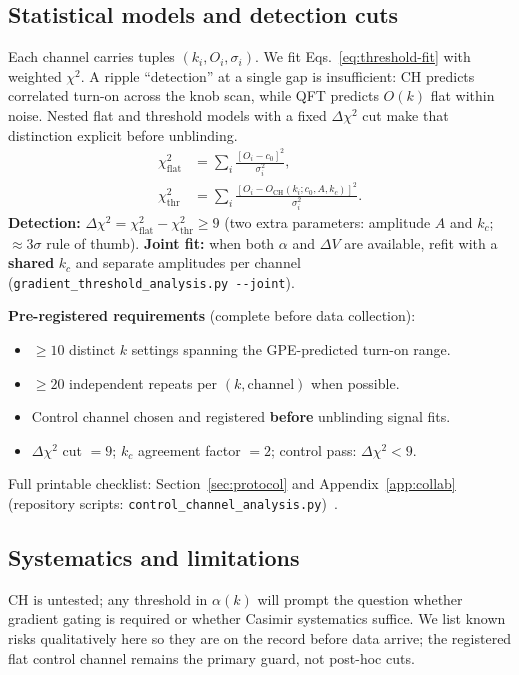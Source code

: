 \documentclass[11pt,a4paper]{article}
\newcommand{\py}[1]{\nolinkurl{#1}}
\begin{document}
\subsection{Statistical models and detection cuts}

Each channel carries tuples $(k_i, O_i, \sigma_i)$.
We fit Eqs.~\ref{eq:threshold-fit} with weighted $\chi^2$.
A ripple ``detection'' at a single gap is insufficient: CH predicts correlated turn-on across the knob scan, while QFT predicts $O(k)$ flat within noise.
Nested flat and threshold models with a fixed $\Delta\chi^2$ cut make that distinction explicit before unblinding.
\begin{align}
  \chi^2_{\mathrm{flat}} &= \sum_i \frac{[O_i - c_0]^2}{\sigma_i^2}, \\
  \chi^2_{\mathrm{thr}} &= \sum_i \frac{[O_i - O_{\mathrm{CH}}(k_i; c_0, A, k_c)]^2}{\sigma_i^2}.
\end{align}
\textbf{Detection:} $\Delta\chi^2 = \chi^2_{\mathrm{flat}} - \chi^2_{\mathrm{thr}} \geq 9$ (two extra parameters: amplitude $A$ and $k_c$; $\approx 3\sigma$ rule of thumb).
\textbf{Joint fit:} when both $\alpha$ and $\Delta V$ are available, refit with a \textbf{shared} $k_c$ and separate amplitudes per channel (\py{gradient_threshold_analysis.py --joint}).

\textbf{Pre-registered requirements} (complete before data collection):
\begin{itemize}[leftmargin=*]
  \item $\geq 10$ distinct $k$ settings spanning the GPE-predicted turn-on range.
  \item $\geq 20$ independent repeats per $(k, \text{channel})$ when possible.
  \item Control channel chosen and registered \textbf{before} unblinding signal fits.
  \item $\Delta\chi^2$ cut $= 9$; $k_c$ agreement factor $= 2$; control pass: $\Delta\chi^2 < 9$.
\end{itemize}

Full printable checklist: Section~\ref{sec:protocol} and Appendix~\ref{app:collab} (repository scripts: \texttt{control\_channel\_analysis.py})~\cite{CHSpaceFabric2026}.

\subsection{Systematics and limitations}
\label{sec:systematics}

CH is untested; any threshold in $\alpha(k)$ will prompt the question whether gradient gating is required or whether Casimir systematics suffice.
We list known risks qualitatively here so they are on the record before data arrive; the registered flat control channel remains the primary guard, not post-hoc cuts.
\end{document}
